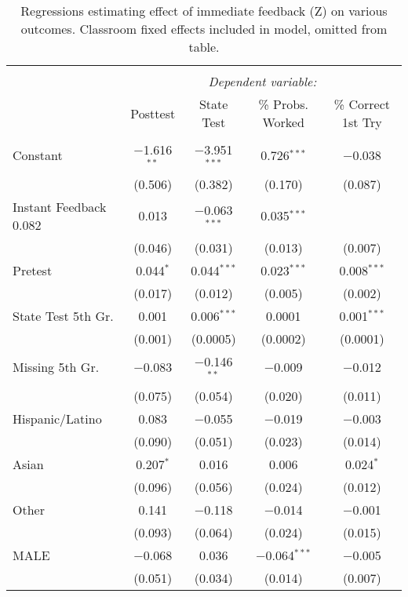 
\begin{table}[!htbp] \centering 
  \caption{Regressions estimating effect of immediate feedback (Z) on various outcomes. Classroom fixed effects included in model, omitted from table.} 
  \label{} 
\begin{tabular}{@{\extracolsep{5pt}}lcccc} 
\\[-1.8ex]\hline 
\hline \\[-1.8ex] 
 & \multicolumn{4}{c}{\textit{Dependent variable:}} \\ 
\cline{2-5} 
 & Posttest & State Test & \% Probs. Worked & \% Correct 1st Try \\ 
\hline \\[-1.8ex] 
 Constant & $-$1.616$^{**}$ & $-$3.951$^{***}$ & 0.726$^{***}$ & $-$0.038 \\ 
  & (0.506) & (0.382) & (0.170) & (0.087) \\ 
 Instant Feedback 0.082 & 0.013 & $-$0.063$^{***}$ & 0.035$^{***}$ \\ 
  & (0.046) & (0.031) & (0.013) & (0.007) \\ 
 Pretest & 0.044$^{*}$ & 0.044$^{***}$ & 0.023$^{***}$ & 0.008$^{***}$ \\ 
  & (0.017) & (0.012) & (0.005) & (0.002) \\ 
 State Test 5th Gr. & 0.001 & 0.006$^{***}$ & 0.0001 & 0.001$^{***}$ \\ 
  & (0.001) & (0.0005) & (0.0002) & (0.0001) \\ 
Missing 5th Gr. & $-$0.083 & $-$0.146$^{**}$ & $-$0.009 & $-$0.012 \\ 
  & (0.075) & (0.054) & (0.020) & (0.011) \\ 
 Hispanic/Latino & 0.083 & $-$0.055 & $-$0.019 & $-$0.003 \\ 
  & (0.090) & (0.051) & (0.023) & (0.014) \\ 
 Asian & 0.207$^{*}$ & 0.016 & 0.006 & 0.024$^{*}$ \\ 
  & (0.096) & (0.056) & (0.024) & (0.012) \\ 
 Other & 0.141 & $-$0.118 & $-$0.014 & $-$0.001 \\ 
  & (0.093) & (0.064) & (0.024) & (0.015) \\ 
 MALE & $-$0.068 & 0.036 & $-$0.064$^{***}$ & $-$0.005 \\ 
  & (0.051) & (0.034) & (0.014) & (0.007) \\ 

\end{tabular}
\end{table}
